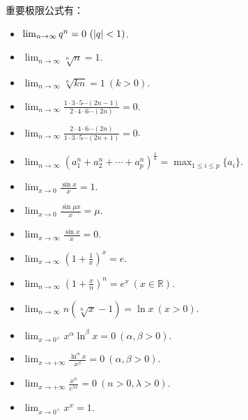 重要极限公式有：
\begin{itemize}
	\item \(\lim_{n\to\infty} q^n=0\ (\abs{q}<1)\).%
	\item \(\lim_{n\to\infty} \sqrt[n]{n}=1\).%
	\item \(\lim_{n\to\infty} \sqrt[n]{k n} = 1\ (k>0)\).%
	\item \(\lim_{n\to\infty} \frac{1 \cdot 3 \cdot 5 \dotsm (2n-1)}{2 \cdot 4 \cdot 6 \dotsm (2n)} = 0\).%
	\item \(\lim_{n\to\infty} \frac{2 \cdot 4 \cdot 6 \dotsm (2n)}{1 \cdot 3 \cdot 5 \dotsm (2n+1)} = 0\).%
	\item \(\lim_{n\to\infty} (a_1^n + a_2^n + \dotsb + a_p^n)^{\frac1n} = \max_{1\leq i\leq p} \{a_i\}\).%
	\item \(\lim_{x\to0} \frac{\sin x}{x} = 1\).%
	\item \(\lim_{x\to0} \frac{\sin \mu x}{x}=\mu\).
	\item \(\lim_{x\to\infty} \frac{\sin x}{x} = 0\).
	\item \(\lim_{x\to\infty} \left(1+\frac1x\right)^x = e\).%
	\item \(\lim_{n\to\infty} \left(1+\frac{x}{n}\right)^n=e^x\ (x\in\mathbb{R})\).%
	\item \(\lim_{n\to\infty} n\left(\sqrt[n]{x}-1\right)=\ln x\ (x>0)\).%
	\item \(\lim_{x\to0^+} x^\alpha \ln^\beta x = 0\ (\alpha,\beta > 0)\).%
	\item \(\lim_{x\to+\infty} \frac{\ln^\alpha x}{x^\beta} = 0\ (\alpha,\beta>0)\).%
	\item \(\lim_{x\to+\infty} \frac{x^n}{e^{\lambda x}}=0\ (n>0,\lambda>0)\).%
	\item \(\lim_{x\to0^+} x^x = 1\).%
\end{itemize}


